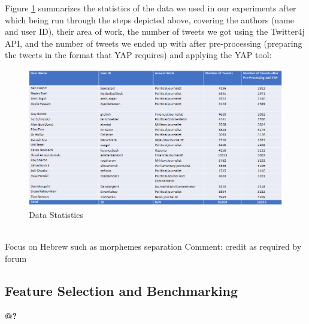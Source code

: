 \documentclass[a4paper]{article}
\begin{document}
Figure \ref{fig:data_stats} summarizes the statistics of the data we used in our experiments after which being run through the steps depicted above, covering the authors (name and user ID), their area of work, the number of tweets we got using the Twitter4j API, and the number of tweets we ended up with after pre-processing (preparing the tweets in the format that YAP requires) and applying the YAP tool:\\
\begin{figure}[h!]
	\includegraphics[width=1\textwidth]{"stats/DataStats"}
	\caption{Data Statistics}
		\label{fig:data_stats}
\end{figure}\\

Focus on Hebrew such as morphemes separation
Comment: credit as required by forum
\subsection{Feature Selection and Benchmarking}
\textbf{@?}\\
\end{document}
